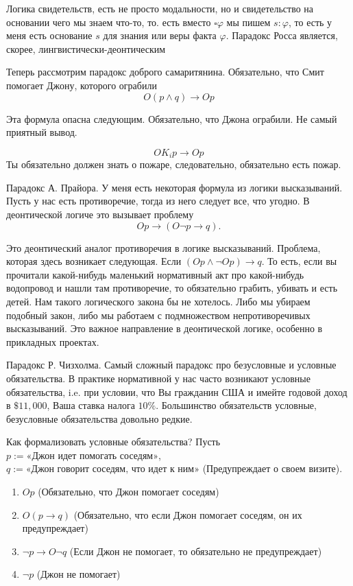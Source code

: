 \documentclass[openany]{book}
\theoremstyle{plain}
\theoremstyle{definition}
\begin{document}
Логика свидетельств, есть не просто модальности, но и свидетельство на основании чего мы знаем что-то, то. есть вместо \(\square \varphi\) мы пишем \(s : \varphi\), то есть у меня есть основание \(s\) для знания или веры факта \(\varphi\). Парадокс Росса является, скорее, лингвистически-деонтическим



Теперь рассмотрим парадокс доброго самаритянина. Обязательно, что Смит помогает Джону, которого ограбили
\[O (p \land q) \to O p\]

Эта формула опасна следующим. Обязательно, что Джона ограбили. Не самый приятный вывод. 

\[O K_i p \to O p\]
Ты обязательно должен знать о пожаре, следовательно, обязательно есть пожар.

Парадокс А. Прайора. У меня есть некоторая формула из логики высказываний. Пусть у нас есть противоречие, тогда из него следует все, что угодно. В деонтической логиче это вызывает проблему \[O p \to (O \neg p \to q).\]

Это деонтический аналог противоречия в логике высказываний. Проблема, которая здесь возникает следующая. Если \((O p \land \neg O p) \to q\). То есть, если вы прочитали какой-нибудь маленький нормативный акт про какой-нибудь водопровод и нашли там противоречие, то обязательно грабить, убивать и есть детей. Нам такого логического закона бы не хотелось. Либо мы убираем подобный закон, либо мы работаем с подмножеством непротиворечивых высказываний. Это важное направление в деонтической логике, особенно в прикладных проектах.

Парадокс Р. Чизхолма. Самый сложный парадокс про безусловные и условные обязательства. В практике нормативной у нас часто возникают условные обязательства, i.e. при условии, что Вы гражданин США и имейте годовой доход в \(\$11,000\), Ваша ставка налога \(10\%\). Большинство обязательств условные, безусловные обязательства довольно редкие. 

Как формализовать условные обязательства? Пусть \(p := \text{«Джон идет помогать соседям»}\), \(q := \text{«Джон говорит соседям, что идет к ним»}\) (Предупреждает о своем визите).

\begin{enumerate}
\item \(O p\) (Обязательно, что Джон помогает соседям)
\item \(O (p \to q)\) (Обязательно, что если Джон помогает соседям, он их предупреждает)
\item \(\neg p \to O \neg q\) (Если Джон не помогает, то обязательно не предупреждает)
\item \(\neg p\) (Джон не помогает)
\end{enumerate}
\end{document}
